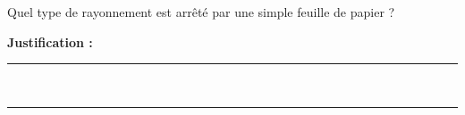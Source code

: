 Quel type de rayonnement est arrêté par une simple feuille de papier ?

\choices

\noindent\textbf{Justification :} \hrulefill \\[2.5ex]
\rule{\linewidth}{0.4pt} \\[2.5ex]
\rule{\linewidth}{0.4pt}
\vfill
